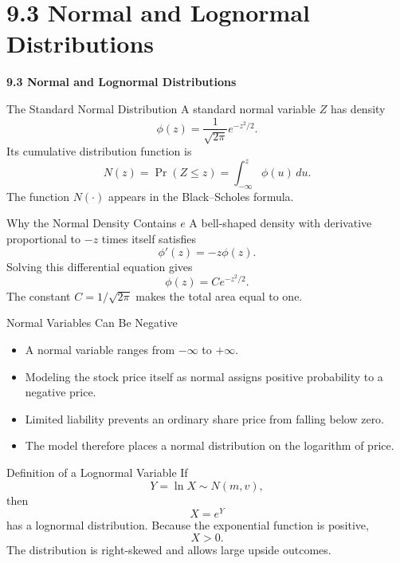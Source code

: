 \documentclass[aspectratio=169]{beamer}
\begin{document}
\section{9.3 Normal and Lognormal Distributions}
\begin{frame}[plain]
\centering\vfill
{\color{TitleBlue}\Large\bfseries 9.3 Normal and Lognormal Distributions}\par
\vspace{0.5cm}{\large Why the model applies normality to log returns rather than prices}\par
\vfill\end{frame}

\begin{frame}[t]{The Standard Normal Distribution}
\justifying
A standard normal variable $Z$ has density
\[\phi(z)=\frac{1}{\sqrt{2\pi}}e^{-z^2/2}.\]
Its cumulative distribution function is
\[N(z)=\Pr(Z\le z)=\int_{-\infty}^{z}\phi(u)\,du.\]
The function $N(\cdot)$ appears in the Black--Scholes formula.
\end{frame}

\begin{frame}[t]{Why the Normal Density Contains $e$}
\justifying
A bell-shaped density with derivative proportional to $-z$ times itself satisfies
\[\phi'(z)=-z\phi(z).\]
Solving this differential equation gives
\[\phi(z)=Ce^{-z^2/2}.\]
The constant $C=1/\sqrt{2\pi}$ makes the total area equal to one.
\end{frame}

\begin{frame}[t]{Normal Variables Can Be Negative}
\justifying
\begin{itemize}
\item A normal variable ranges from $-\infty$ to $+\infty$.
\item Modeling the stock price itself as normal assigns positive probability to a negative price.
\item Limited liability prevents an ordinary share price from falling below zero.
\item The model therefore places a normal distribution on the logarithm of price.
\end{itemize}
\end{frame}

\begin{frame}[t]{Definition of a Lognormal Variable}
\justifying
If
\[Y=\ln X\sim N(m,v),\]
then
\[X=e^Y\]
has a lognormal distribution. Because the exponential function is positive,
\[X>0.\]
The distribution is right-skewed and allows large upside outcomes.
\end{frame}
\end{document}
